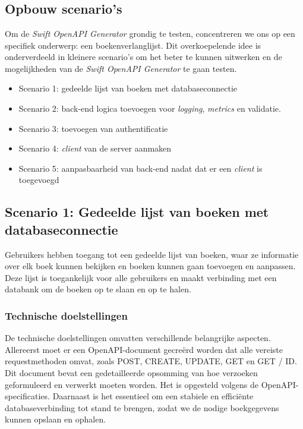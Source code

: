 
\chapter{}%

\label{ch:proof-of-concept}

\section{Opbouw scenario's}

Om de \textit{Swift OpenAPI Generator} grondig te testen, concentreren we ons op een specifiek onderwerp: een boekenverlanglijst. Dit overkoepelende idee is onderverdeeld in kleinere scenario’s om het beter te kunnen uitwerken en de mogelijkheden van de \textit{Swift OpenAPI Generator} te gaan testen. 

\begin{itemize}
  \item	Scenario 1: gedeelde lijst van boeken met databaseconnectie
  \item	Scenario 2: back-end logica toevoegen voor \textit{logging}, \textit{metrics} en validatie. 
  \item Scenario 3: toevoegen van authentificatie
  \item Scenario 4: \textit{client} van de server aanmaken
  \item Scenario 5: aanpasbaarheid van back-end nadat dat er een \textit{client} is toegevoegd
\end{itemize}

\section{Scenario 1: Gedeelde lijst van boeken met databaseconnectie}
Gebruikers hebben toegang tot een gedeelde lijst van boeken, waar ze informatie over elk boek kunnen bekijken en boeken kunnen gaan toevoegen en aanpassen. Deze lijst is toegankelijk voor alle gebruikers en maakt verbinding met een databank om de boeken op te slaan en op te halen. 

\subsection{Technische doelstellingen}
De technische doelstellingen omvatten verschillende belangrijke aspecten. Allereerst moet er een OpenAPI-document gecreërd worden dat alle vereiste requestmethoden omvat, zoals POST, CREATE, UPDATE, GET en GET / ID.  Dit document bevat een gedetailleerde opsomming van hoe verzoeken geformuleerd en verwerkt moeten worden. Het is opgesteld volgens de OpenAPI-specificaties. Daarnaast is het essentieel om een stabiele en efficiënte databaseverbinding tot stand te brengen, zodat we de nodige boekgegevens kunnen opslaan en ophalen. 

